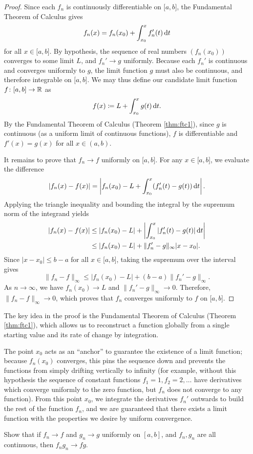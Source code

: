 \documentclass[../analysis1.tex]{subfiles}
\begin{document}
\begin{proof}
    Since each $f_n$ is continuously differentiable on $\lbrack a,b \rbrack$, the Fundamental Theorem of Calculus gives
    \[
        f_n(x) = f_n(x_0) + \int_{x_0}^x f_n'(t) \d{t}
    \]
    for all $x \in \lbrack a,b \rbrack$. By hypothesis, the sequence of real numbers $(f_n(x_0))$ converges to some limit $L$, and $f_n' \to g$ uniformly. Because each $f_n'$ is continuous and converges uniformly to $g$, the limit function $g$ must also be continuous, and therefore integrable on $\lbrack a,b \rbrack$. We may thus define our candidate limit function $f \colon \lbrack a,b \rbrack \to \mathbb{R}$ as
    \[
        f(x) \coloneqq L + \int_{x_0}^x g(t) \d{t}.
    \]
    By the Fundamental Theorem of Calculus (Theorem \ref{thm:ftc1}), since $g$ is continuous (as a uniform limit of continuous functions), $f$ is differentiable and $f'(x) = g(x)$ for all $x \in (a,b)$.
    
    It remains to prove that $f_n \to f$ uniformly on $\lbrack a,b \rbrack$. For any $x \in \lbrack a,b \rbrack$, we evaluate the difference
    \[
        |f_n(x) - f(x)| = \left| f_n(x_0) - L + \int_{x_0}^x (f_n'(t) - g(t)) \d{t} \right|.
    \]
    Applying the triangle inequality and bounding the integral by the supremum norm of the integrand yields
    \begin{align*}
        |f_n(x) - f(x)| &\le |f_n(x_0) - L| + \left| \int_{x_0}^x |f_n'(t) - g(t)| \d{t} \right|\\
        &\le |f_n(x_0) - L| + \|f_n' - g\|_\infty |x - x_0|.
    \end{align*}
    Since $|x - x_0| \le b-a$ for all $x \in \lbrack a,b \rbrack$, taking the supremum over the interval gives
    \[
        \|f_n - f\|_\infty \le |f_n(x_0) - L| + (b-a)\|f_n' - g\|_\infty.
    \]
    As $n \to \infty$, we have $f_n(x_0) \to L$ and $\|f_n' - g\|_\infty \to 0$. Therefore, $\|f_n - f\|_\infty \to 0$, which proves that $f_n$ converges uniformly to $f$ on $\lbrack a,b \rbrack$.
\end{proof}

\begin{remark}
    The key idea in the proof is the Fundamental Theorem of Calculus (Theorem \ref{thm:ftc1}), which allows us to reconstruct a function globally from a single starting value and its rate of change by integration. 
    
    The point $x_0$ acts as an ``anchor'' to guarantee the existence of a limit function; because $f_n(x_0)$ converges, this pins the sequence down and prevents the functions from simply drifting vertically to infinity (for example, without this hypothesis the sequence of constant functions $f_1=1,f_2=2,\dots$ have derivatives which converge uniformly to the zero function, but $f_n$ does not converge to any function). From this point $x_0$, we integrate the derivatives $f_n'$ outwards to build the rest of the function $f_n$, and we are guaranteed that there exists a limit function with the properties we desire by uniform convergence.
\end{remark}

\begin{exercise*}
    Show that if $f_n\to f$ and $g_n\to g$ uniformly on $[a,b]$, and $f_n,g_n$ are all continuous, then $f_ng_n\to fg$.
\end{exercise*}
\end{document}
